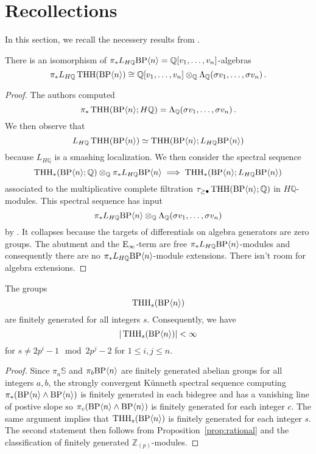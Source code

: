 \section{Recollections}
In this section, we recall the necessery results from \cite{AKCH23}. 

\begin{proposition}\label{prop:rational}
There is an isomorphism of $\pi_{*}L_{H\mathbb{Q}}\mathrm{BP}\langle n\rangle=\mathbb{Q}[v_{1},\dots ,v_{n}]$-algebras
\[ \pi_{*}L_{H\mathbb{Q}}\operatorname{THH}(\mathrm{BP}\langle n\rangle )\cong\mathbb{Q}[v_{1},\dots ,v_{n}]\otimes_{\mathbb{Q}} \Lambda_{\mathbb{Q}} (\sigma v_{1},\dots ,\sigma v_{n}) \,.\]
\end{proposition}
\begin{proof}
The authors computed 
\[ \pi_{*}\operatorname{THH}(\mathrm{BP}\langle n\rangle;H\mathbb{Q} )=\Lambda_{\mathbb{Q}} (\sigma v_{1},\dots ,\sigma v_{n})\,.\]
We then observe that 
\[L_{H\mathbb{Q}}\operatorname{THH}(\mathrm{BP}\langle n\rangle )\simeq \operatorname{THH}(\mathrm{BP}\langle n\rangle;L_{H\mathbb{Q}}\mathrm{BP}\langle n\rangle )\]
because $L_{H\mathbb{Q}}$ is a smashing localization. We then consider the spectral sequence 
\[
\operatorname{THH}_{*}(\mathrm{BP}\langle n\rangle;\mathbb{Q})\otimes_{\mathbb{Q}} \pi_{*}L_{H\mathbb{Q}}\mathrm{BP}\langle n\rangle\implies \operatorname{THH}_{*}(\mathrm{BP}\langle n\rangle;L_{H\mathbb{Q}}\mathrm{BP}\langle n\rangle)
\]
associated to the multiplicative complete filtration $\tau_{\ge \bullet}\operatorname{THH}(\mathrm{BP}\langle n\rangle;\mathbb{Q})$ in $H\mathbb{Q}$-modules. This spectral sequence has input 
\[ \pi_{*}L_{H\mathbb{Q}}\mathrm{BP}\langle n\rangle\otimes_{\mathbb{Q}} \Lambda_{\mathbb{Q}} (\sigma v_{1},\dots ,\sigma v_{n})\]
by \cite[Proposition~3.7]{AKCH22}. It collapses because the targets of differentials on algebra generators are zero groups. The abutment and the $\mathrm{E}_{\infty}$-term are free $\pi_{*}L_{H\mathbb{Q}}\mathrm{BP}\langle n\rangle$-modules and consequently there are no $\pi_{*}L_{H\mathbb{Q}}\mathrm{BP}\langle n\rangle$-module extensions. There isn't room for algebra extensions. 
\end{proof}

\begin{proposition}
The groups 
\[ 
\operatorname{THH}_{s}(\mathrm{BP}\langle n\rangle )
\]
are finitely generated for all integers $s$. 
Consequently, we have 
\[
|\operatorname{THH}_{s}(\mathrm{BP}\langle n\rangle )|<\infty\]
for $s\ne 2p^{i}-1 \mod 2p^{j}-2$ for $1\le i,j\le n$. 
\end{proposition}
\begin{proof}
Since $\pi_{a}\mathbb{S}$ and $\pi_{b}\mathrm{BP}\langle n\rangle$ are finitely generated abelian groups for all integers $a,b$, the strongly convergent K\"unneth spectral sequence computing $\pi_{*}(\mathrm{BP}\langle n\rangle\wedge \mathrm{BP}\langle n\rangle)$ is finitely generated in each bidegree and has a vanishing line of postive slope so $\pi_{c}(\mathrm{BP}\langle n\rangle\wedge \mathrm{BP}\langle n\rangle)$ is finitely generated for each integer $c$. The same argument implies that $\operatorname{THH}_{s}(\mathrm{BP}\langle n\rangle)$ is finitely generated for each integer $s$. The second statement then follows from Proposition~\ref{prop:rational} and the classification of finitely generated $\mathbb{Z}_{(p)}$-modules. 
\end{proof}